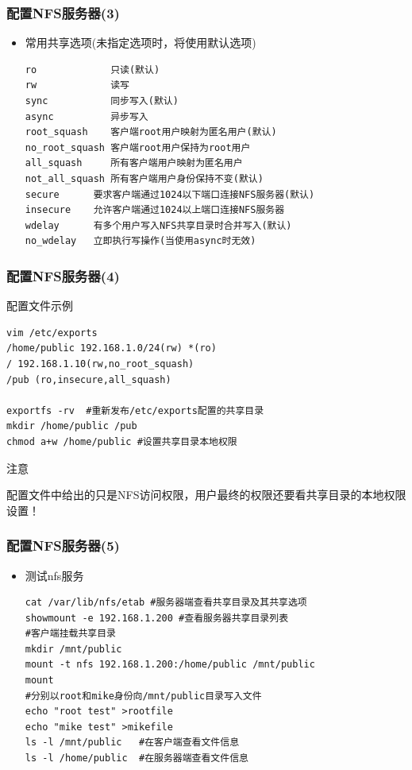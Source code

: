 \documentclass[xcolor=svgnames,presentation]{beamer}
\begin{document}
\begin{frame}[fragile]
\frametitle{配置NFS服务器(3)}
\label{sec-1-7}
\begin{itemize}

\item 常用共享选项(未指定选项时，将使用默认选项)\\
\label{sec-1-7-1}%
\begin{verbatim}
ro             只读(默认)
rw             读写
sync           同步写入(默认)
async          异步写入
root_squash    客户端root用户映射为匿名用户(默认)
no_root_squash 客户端root用户保持为root用户
all_squash     所有客户端用户映射为匿名用户
not_all_squash 所有客户端用户身份保持不变(默认)
secure      要求客户端通过1024以下端口连接NFS服务器(默认)
insecure    允许客户端通过1024以上端口连接NFS服务器
wdelay      有多个用户写入NFS共享目录时合并写入(默认)
no_wdelay   立即执行写操作(当使用async时无效)
\end{verbatim}
\end{itemize} %
\end{frame}
\begin{frame}[fragile]
\frametitle{配置NFS服务器(4)}
\label{sec-1-8}
\begin{exampleblock}{配置文件示例}
\label{sec-1-8-1}


\begin{verbatim}
vim /etc/exports
/home/public 192.168.1.0/24(rw) *(ro)
/ 192.168.1.10(rw,no_root_squash)
/pub (ro,insecure,all_squash)

exportfs -rv  #重新发布/etc/exports配置的共享目录
mkdir /home/public /pub
chmod a+w /home/public #设置共享目录本地权限
\end{verbatim}
\end{exampleblock}
\begin{block}{注意}
\label{sec-1-8-2}

配置文件中给出的只是NFS访问权限，用户最终的权限还要看共享目录的本地权限设置！
\end{block}
\end{frame}
\begin{frame}[fragile]
\frametitle{配置NFS服务器(5)}
\label{sec-1-9}
\begin{itemize}

\item 测试nfs服务\\
\label{sec-1-9-1}%
\begin{verbatim}
cat /var/lib/nfs/etab #服务器端查看共享目录及其共享选项
showmount -e 192.168.1.200 #查看服务器共享目录列表
#客户端挂载共享目录
mkdir /mnt/public
mount -t nfs 192.168.1.200:/home/public /mnt/public
mount
#分别以root和mike身份向/mnt/public目录写入文件
echo "root test" >rootfile
echo "mike test" >mikefile
ls -l /mnt/public   #在客户端查看文件信息
ls -l /home/public  #在服务器端查看文件信息
\end{verbatim}
\end{itemize} %
\end{frame}
\end{document}

